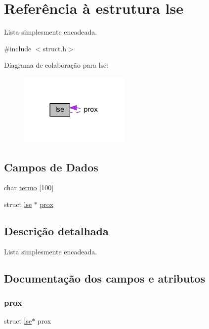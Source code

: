 \hypertarget{structlse}{}\section{Referência à estrutura lse}
\label{structlse}


Lista simplesmente encadeada.  




{\ttfamily \#include $<$struct.\+h$>$}



Diagrama de colaboração para lse\+:\nopagebreak
\begin{figure}[H]
\begin{center}
\leavevmode
\includegraphics[width=153pt]{structlse__coll__graph}
\end{center}
\end{figure}
\subsection*{Campos de Dados}
\begin{DoxyCompactItemize}
\item 
char \hyperlink{structlse_a9df8ca8433f565cd387dd62ce6023a51}{termo} \mbox{[}100\mbox{]}
\item 
struct \hyperlink{structlse}{lse} $\ast$ \hyperlink{structlse_af49f0d9ba8c6fde74ac1b0ffef3c992b}{prox}
\end{DoxyCompactItemize}


\subsection{Descrição detalhada}
Lista simplesmente encadeada. 

\subsection{Documentação dos campos e atributos}
\mbox{\label{structlse_af49f0d9ba8c6fde74ac1b0ffef3c992b}} 
\subsubsection{\texorpdfstring{prox}{prox}}
{\footnotesize\ttfamily struct \hyperlink{structlse}{lse}$\ast$ prox}

